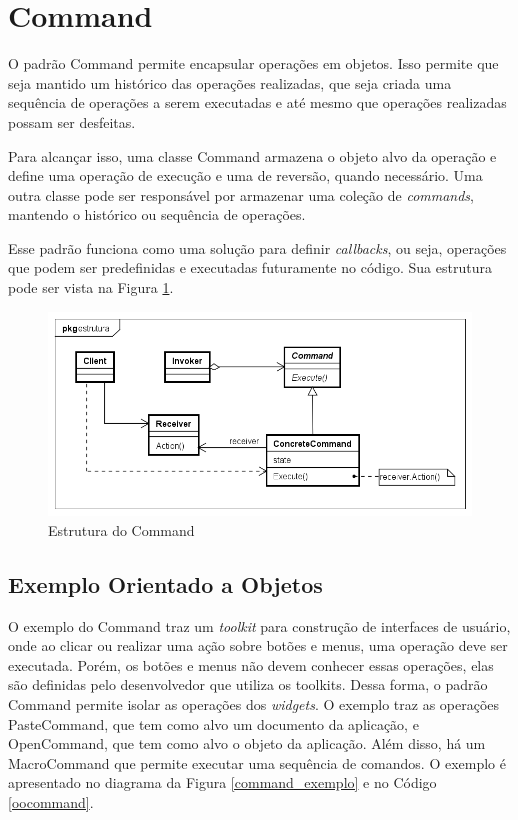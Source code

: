 \section{Command}

O padrão Command permite encapsular operações 
em objetos. Isso permite que seja mantido um 
histórico das operações realizadas, que seja 
criada uma sequência de operações a serem 
executadas e até mesmo que operações realizadas 
possam ser desfeitas.\cite{gamma:1995}

Para alcançar isso, uma classe Command armazena o 
objeto alvo da operação e define uma operação 
de execução e uma de reversão, quando necessário. 
Uma outra classe pode ser responsável por armazenar 
uma coleção de \textit{commands}, mantendo o 
histórico ou sequência de operações. 

Esse padrão funciona como uma solução para definir 
\textit{callbacks}, ou seja, operações que podem ser 
predefinidas e executadas futuramente no código. Sua 
estrutura pode ser vista na Figura \ref{command_struct}.

\begin{figure}[htb]
	\caption{\label{command_struct}Estrutura do Command}
	\begin{center}
	    \includegraphics[scale=0.5]{5_padroes-contexto-funcional/5.3_comportamentais/5.3.02_command/command_struct.png}
	\end{center}
\end{figure}

\subsection*{Exemplo Orientado a Objetos}

O exemplo do Command traz um \textit{toolkit} para 
construção de interfaces de usuário, onde ao clicar 
ou realizar uma ação sobre botões e menus, uma 
operação deve ser executada. Porém, os botões e 
menus não devem conhecer essas operações, elas são 
definidas pelo desenvolvedor que utiliza os toolkits. 
Dessa forma, o padrão Command permite isolar as 
operações dos \textit{widgets}. O exemplo traz as 
operações PasteCommand, que tem como alvo um 
documento da aplicação, e OpenCommand, que tem como 
alvo o objeto da aplicação. Além disso, há um 
MacroCommand que permite executar uma sequência 
de comandos. O exemplo é apresentado no diagrama da 
Figura \ref{command_exemplo} e no Código \ref{oocommand}.

